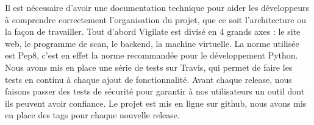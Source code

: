 Il est nécessaire d’avoir une documentation technique pour aider les développeurs à comprendre correctement l’organisation du projet, que ce soit l’architecture ou la façon de travailler.
Tout d’abord Vigilate est divisé en 4 grands axes : le site web, le programme de scan, le backend, la machine virtuelle.
La norme utilisée est Pep8, c’est en effet la norme recommandée pour le développement Python.
Nous avons mis en place une série de tests sur Travis, qui permet de faire les tests en continu à chaque ajout de fonctionnalité. Avant chaque release, nous faisons passer des tests de sécurité pour garantir à nos utilisateurs un outil dont ils peuvent avoir confiance.
Le projet est mis en ligne sur github, nous avons mis en place des tags pour chaque nouvelle release. 